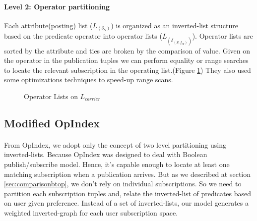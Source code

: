 \documentclass[a4paper,12pt,oneside]{book}
\theoremstyle{definition}
\theoremstyle{remark}
\begin{document}
\paragraph*{Level 2: Operator partitioning}
Each attribute(posting) list ($L_{(\delta_S)}$) is organized as an inverted-list structure based on the predicate operator into operator lists ($L_{(\delta_{(S,f_{op})})}$). Operator lists are sorted by the attribute and ties are broken by the comparison of value. Given on the operator in the publication tuples we can perform equality or range searches to locate the relevant subscription in the operating list.(Figure \ref{img:l2part}) They also used some optimizations techniques to speed-up range scans.

\begin{figure}[H]
\caption{Operator Lists on $L_{carrier}$}
\centering
{}
\label{img:l2part}
\end{figure}

\subsection{Modified OpIndex}
\paragraph*{}
From OpIndex, we adopt only the concept of two level partitioning using inverted-lists. Because OpIndex was designed to deal with Boolean publish/subscribe model. Hence, it's capable enough to locate at least one matching subscription when a publication arrives. But as we described at section \ref{sec:comparisonbtop}, we don't rely on individual subscriptions. So we need to partition each subscription tuples and, relate the inverted-list of predicates based on user given preference. Instead of a set of inverted-lists, our model generates a weighted inverted-graph for each user subscription space.
\end{document}
